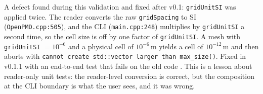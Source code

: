 A defect found during this validation and fixed after v0.1:
\texttt{gridUnitSI} was applied twice. The reader converts the raw
\texttt{gridSpacing} to SI (\texttt{OpenPMD.cpp:505}), and the CLI
(\texttt{main.cpp:248}) multiplies by \texttt{gridUnitSI} a second time, so
the cell size is off by one factor of \texttt{gridUnitSI}. A mesh with
\texttt{gridUnitSI} $=10^{-6}$ and a physical cell of $10^{-6}$\,m yields a
cell of $10^{-12}$\,m and then aborts with
\texttt{cannot create std::vector larger than max\_size()}. Fixed in v0.1.1
with an end-to-end test that fails on the old code \citep{W4b}. This is a
lesson about reader-only unit tests: the reader-level conversion is correct,
but the composition at the CLI boundary is what the user sees, and it was
wrong.
